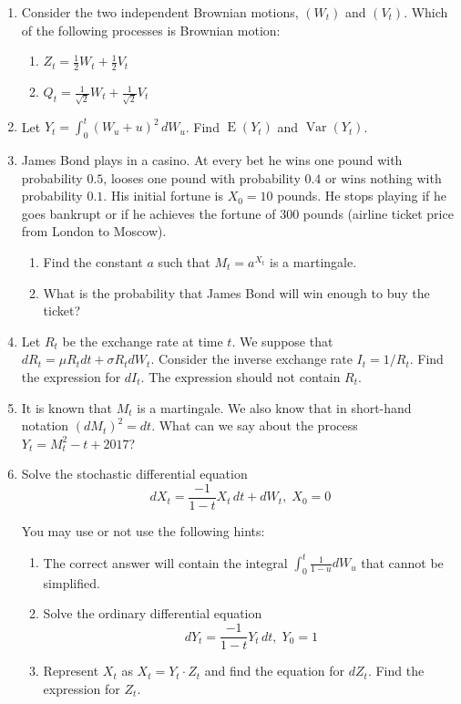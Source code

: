 \documentclass[12pt,a4paper]{article}
\DeclareMathOperator{\Var}{Var}
\DeclareMathOperator{\E}{E}
\begin{document}
\begin{enumerate}

\item Consider the two independent Brownian motions, $(W_t)$ and $(V_t)$. Which of the following processes is Brownian motion:
\begin{enumerate}
\item $Z_t = \frac{1}{2}W_t + \frac{1}{2}V_t$
\item $Q_t = \frac{1}{\sqrt{2}}W_t + \frac{1}{\sqrt{2}}V_t$
\end{enumerate}

\item Let $Y_t = \int_0^t (W_u + u)^2 \, dW_u$. Find $\E(Y_t)$ and $\Var(Y_t)$.

\item James Bond plays in a casino. At every bet he wins one pound with probability $0.5$, looses one pound with probability $0.4$ or wins nothing with probability $0.1$. His initial fortune is $X_0 = 10$ pounds. He stops playing if he goes bankrupt or if he achieves the fortune of $300$ pounds (airline ticket price from London to Moscow).
\begin{enumerate}
\item Find the constant $a$ such that $M_t = a^{X_t}$ is a martingale.
\item What is the probability that James Bond will win enough to buy the ticket?
\end{enumerate}


\item Let $R_t$ be the exchange rate at time $t$. We suppose that $dR_t = \mu R_t dt + \sigma R_t dW_t$. Consider the inverse exchange rate $I_t = 1/R_t$. Find the expression for $dI_t$. The expression should not contain $R_t$.

\item It is known that $M_t$ is a martingale. We also know that in short-hand notation $(dM_t)^2 = dt$. What can we say about the process $Y_t = M_t^2 - t + 2017$?

\item Solve the stochastic differential equation
\begin{equation}
dX_t = \frac{-1}{1 - t}X_t \, dt + dW_t, \; X_0 = 0
\end{equation}

You may use or not use the following hints:

\begin{enumerate}
\item The correct answer will contain the integral $\int_0^t \frac{1}{1 - u} dW_u$ that cannot be simplified.
\item Solve the ordinary differential equation
\begin{equation}
dY_t = \frac{-1}{1 - t}Y_t \, dt, \; Y_0 = 1
\end{equation}
\item Represent $X_t$ as $X_t = Y_t \cdot Z_t$ and find the equation for $dZ_t$. Find the expression for $Z_t$.
\end{enumerate}


\end{enumerate}
\end{document}

